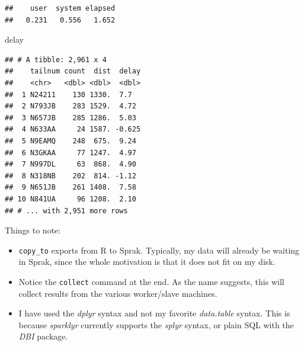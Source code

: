 \documentclass[]{book}
\newenvironment{Shaded}{\begin{snugshade}}{\end{snugshade}}
\newcommand{\DataTypeTok}[1]{\textcolor[rgb]{0.13,0.29,0.53}{#1}}
\newcommand{\DecValTok}[1]{\textcolor[rgb]{0.00,0.00,0.81}{#1}}
\newcommand{\KeywordTok}[1]{\textcolor[rgb]{0.13,0.29,0.53}{\textbf{#1}}}
\newcommand{\NormalTok}[1]{#1}
\newcommand{\OperatorTok}[1]{\textcolor[rgb]{0.81,0.36,0.00}{\textbf{#1}}}
\newcommand{\OtherTok}[1]{\textcolor[rgb]{0.56,0.35,0.01}{#1}}
\newcommand{\StringTok}[1]{\textcolor[rgb]{0.31,0.60,0.02}{#1}}
\providecommand{\tightlist}{%
  \setlength{\itemsep}{0pt}\setlength{\parskip}{0pt}}
\theoremstyle{definition}
\theoremstyle{definition}
\theoremstyle{definition}
\theoremstyle{remark}
\begin{document}
\begin{Shaded}
\end{Shaded}

\begin{verbatim}
##    user  system elapsed 
##   0.231   0.556   1.652
\end{verbatim}

\begin{Shaded}
\begin{Highlighting}[]
\NormalTok{delay}
\end{Highlighting}
\end{Shaded}

\begin{verbatim}
## # A tibble: 2,961 x 4
##    tailnum count  dist  delay
##    <chr>   <dbl> <dbl>  <dbl>
##  1 N24211    130 1330.  7.7  
##  2 N793JB    283 1529.  4.72 
##  3 N657JB    285 1286.  5.03 
##  4 N633AA     24 1587. -0.625
##  5 N9EAMQ    248  675.  9.24 
##  6 N3GKAA     77 1247.  4.97 
##  7 N997DL     63  868.  4.90 
##  8 N318NB    202  814. -1.12 
##  9 N651JB    261 1408.  7.58 
## 10 N841UA     96 1208.  2.10 
## # ... with 2,951 more rows
\end{verbatim}

Things to note:

\begin{itemize}
\tightlist
\item
  \texttt{copy\_to} exports from R to Sprak. Typically, my data will already be waiting in Sprak, since the whole motivation is that it does not fit on my disk.
\item
  Notice the \texttt{collect} command at the end. As the name suggests, this will collect results from the various worker/slave machines.
\item
  I have used the \emph{dplyr} syntax and not my favorite \emph{data.table} syntax. This is because \emph{sparklyr} currently supports the \emph{splyr} syntax, or plain SQL with the \emph{DBI} package.
\end{itemize}
\end{document}
